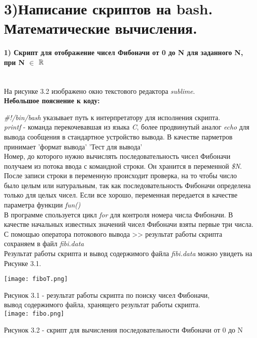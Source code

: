 \newpage
\section*{3)Написание скриптов на bash. Математические вычисления.}
	\paragraph*{1) Скрипт для отображение чисел Фибоначи от 0 до N для заданного N,
		 при N $\in$ $\mathbb{R}$\\ \\}

		На рисунке 3.2 изображено окно текстового редактора \textit{sublime}.\\

		\textbf{Небольшое пояснение к коду:\\}

		\textit{\#!/bin/bash} указывает путь к интерпретатору для исполнения скрипта.\\
		
		\textit{printf} - команда перекочевавшая из языка \textit{C}, более продвинутый аналог \textit{echo} для вывода сообщения в стандартное устройство вывода.
		В качестве парметров принимает 'формат вывода' 'Тест для вывода'\\

		Номер, до которого нужно вычислять последовательность чисел Фибоначи получаем из потока ввода с командной строки. Он хранится в переменной \textit{\$N}. После записи строки в переменную происходит проверка, на то чтобы число было целым или натуральным, так как последовательность Фибоначи определена только для целых чисел.
		Если все хорошо, переменная передается в качестве параметра функции \textit{fun()}\\

		В программе спользуется цикл \textit{for} для контроля номера числа Фибоначи. В качестве начальных известных значений чисел Фибоначи взяты первые три числа.\\

		С помощью оператора потокового вывода >> результат работы скрипта сохраняем в файл \textit{fibi.data}\\
		Результат работы скрипта и вывод содержимого файла \textit{fibi.data} можно увидеть на Рисунке 3.1.\\

		\vspace{0.5cm}
		\begin{center}
			\texttt{[image: fiboT.png]}

			Рисунок 3.1 - результат работы скрипта по поиску чисел Фибоначи, \\ 
			вывод содержимого файла, хранящего результат работы скрипта.\\

			\texttt{[image: fibo.png]}

			Рисунок 3.2 - скрипт для вычисления последовательности Фибоначи от 0 до N\\

		\end{center}

